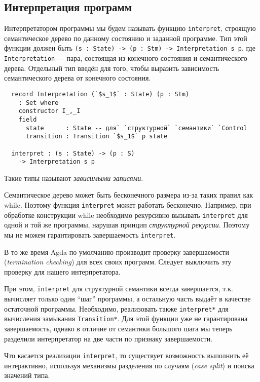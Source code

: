 \documentclass[aps,12pt,final,oneside,onecolumn,musixtex,superscriptaddress,centertags]{article}
\newcommand{\lcode}[1]{\lstinline[basicstyle=\ttfamily\normalsize]{#1}}
\begin{document}
  \subsection{Интерпретация программ}

  Интерпретатором программы мы будем называть функцию \lcode{interpret}, строящую семантическое дерево по данному состоянию и заданной программе. Тип этой функции должен быть \lcode{(s : State) -> (p : Stm) -> Interpretation s p}, где \lcode{Interpretation} --- пара, состоящая из конечного состояния и семантического дерева. Отдельный тип введён для того, чтобы выразить зависимость семантического дерева от конечного состояния.
  \begin{lstlisting}
  record Interpretation (`$s_1$` : State) (p : Stm)
    : Set where
    constructor I_,_I
    field
      state      : State -- для` `структурной` `семантики` `Control
      transition : Transition `$s_1$` p state

  interpret : (s : State) -> (p : S)
    -> Interpretation s p
  \end{lstlisting}
  
  Такие типы называют \emph{зависимыми записями}.

  Семантическое дерево может быть бесконечного размера из-за таких правил как while. Поэтому функция \lcode{interpret} может работать бесконечно. Например, при обработке конструкции while необходимо рекурсивно вызывать \lcode{interpret} для одной и той же программы, нарушая принцип \emph{структурной рекурсии}. Поэтому мы не можем гарантировать завершаемость \lcode{interpret}.

  В то же время Agda по умолчанию производит проверку завершаемости (\emph{termination checking}) для всех своих программ. Следует выключить эту проверку для нашего интерпретатора.

  При этом, \lcode{interpret} для структурной семантики всегда завершается, т.к. вычисляет только один ``шаг'' программы, а остальную часть выдаёт в качестве остаточной программы. Необходимо, реализовать также \lcode{interpret*} для вычисления замыкания \lcode{Transition*}. Для этой функции уже не гарантирована завершаемость, однако в отличие от семантики большого шага мы теперь разделили интерпретатор на две части по признаку завершаемости.

  Что касается реализации \lcode{interpret}, то существует возможность выполнить её интерактивно, используя механизмы разделения по случаям (\emph{case split}) и поиска значений типа.
\end{document}
